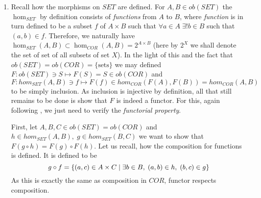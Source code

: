 \documentclass[8pt]{article} %
\begin{document}
\begin{enumerate}[label=\bfseries Problem \arabic*.]
{\begin{enumerate}[label=(\arabic*).]
{\begin{enumerate}[label=(\roman*)]
{						Secondly, let us show that $g=1_A\circ g$ for arbitrary $g\in hom_{Cor}(B,A)$. Similarly,
						to above, if $(b,a)\in g$, then as $(a,a)\in 1_A$ by definition, $(b,a)\in 1_A\circ g$, thus
						$g\subset 1_A\circ g$. Conversely, if $(b,a)\in 1_A\circ g$, then for some $a'\in A$ we have
						$(b,a')\in g$ and $(a',a)\in 1_A\implies a'=a$ (by definition of $1_A$), thus $(b,a)=(b,a')\in 
						g$, hence $1_A\circ g\subset g$ and two sets are equal.
						}
				\end{enumerate}
				}
			\item{Recall how the morphisms on $SET$ are defined. For $A,B\in ob(SET)$ the $\hom_{SET}$ by definition consists of
				{\it functions} from $A$ to $B$, where {\it function} is in turn defined to be a subset $f$ of $A\times B$ such that
				$\forall a\in A\;\exists! b\in B$ such that $(a,b)\in f$. Therefore, we naturally have
				$\hom_{SET}(A,B)\subset \hom_{COR}(A,B)=2^{A\times B}$ (here by $2^X$ we shall denote the set of set of all subsets
				of set $X$). In the light of this and the fact that $ob(SET)=ob(COR)=\{\mbox{sets}\}$ we may defined
				$F:ob(SET)\ni S\mapsto F(S)=S\in ob(COR)$ and $F: hom_{SET}(A,B)\ni f\mapsto F(f)\in hom_{COR}(F(A),F(B))
				= hom_{COR}(A,B)$ to be simply inclusion. As inclusion is injective by definition, all that still remains to be
				done is show that $F$ is indeed a functor. For this, again following \cite[subsection 10.3.1]{tb}, we just need
				to verify the {\it functorial property}.

				First, let $A,B,C\in ob(SET)=ob(COR)$ and $h\in hom_{SET}(A,B),\;g\in hom_{SET}(B,C)$ we want to show that
				$F(g\circ h)=F(g)\circ F(h)$. Let us recall, how the composition for functions is defined. It is defined to be
				\[g\circ f=\left\{(a,c)\in A\times C\mid \exists b\in B,\;(a,b)\in h,\;(b,c)\in g\right\}\]
				As this is exactly the same as composition in $COR$, functor respects composition.

}
\end{enumerate}}
\end{enumerate}
\end{document}
